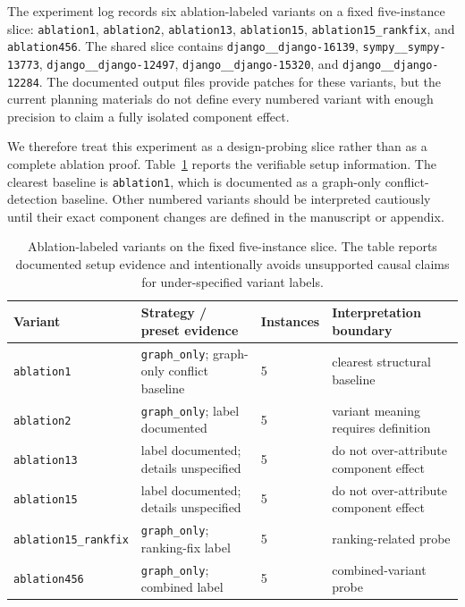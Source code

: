 \documentclass[11pt]{article}
\begin{document}
The experiment log records six ablation-labeled variants on a fixed five-instance slice: \texttt{ablation1}, \texttt{ablation2}, \texttt{ablation13}, \texttt{ablation15}, \texttt{ablation15\_rankfix}, and \texttt{ablation456}.  The shared slice contains \texttt{django\_\_django-16139}, \texttt{sympy\_\_sympy-13773}, \texttt{django\_\_django-12497}, \texttt{django\_\_django-15320}, and \texttt{django\_\_django-12284}.  The documented output files provide patches for these variants, but the current planning materials do not define every numbered variant with enough precision to claim a fully isolated component effect.

We therefore treat this experiment as a design-probing slice rather than as a complete ablation proof.  Table~\ref{tab:ablation-variants} reports the verifiable setup information.  The clearest baseline is \texttt{ablation1}, which is documented as a graph-only conflict-detection baseline.  Other numbered variants should be interpreted cautiously until their exact component changes are defined in the manuscript or appendix.

\begin{table}[t]
\centering
\small
\begin{tabular}{llll}
\toprule
Variant & Strategy / preset evidence & Instances & Interpretation boundary \\
\midrule
\texttt{ablation1} & \texttt{graph\_only}; graph-only conflict baseline & 5 & clearest structural baseline \\
\texttt{ablation2} & \texttt{graph\_only}; label documented & 5 & variant meaning requires definition \\
\texttt{ablation13} & label documented; details unspecified & 5 & do not over-attribute component effect \\
\texttt{ablation15} & label documented; details unspecified & 5 & do not over-attribute component effect \\
\texttt{ablation15\_rankfix} & \texttt{graph\_only}; ranking-fix label & 5 & ranking-related probe \\
\texttt{ablation456} & \texttt{graph\_only}; combined label & 5 & combined-variant probe \\
\bottomrule
\end{tabular}
\caption{Ablation-labeled variants on the fixed five-instance slice.  The table reports documented setup evidence and intentionally avoids unsupported causal claims for under-specified variant labels.}
\label{tab:ablation-variants}
\end{table}
\end{document}
